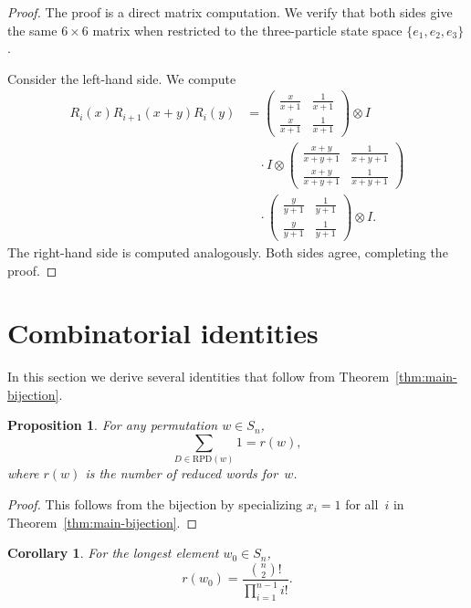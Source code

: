 \documentclass{amsart}
\theoremstyle{plain}
\newtheorem{proposition}[theorem]{Proposition}
\newtheorem{corollary}[theorem]{Corollary}
\theoremstyle{definition}
\theoremstyle{remark}
\begin{document}
\begin{proof}
The proof is a direct matrix computation. We verify that both sides
give the same $6 \times 6$ matrix when restricted to the three-particle
state space $\{e_1, e_2, e_3\}$.

Consider the left-hand side.  We compute
\begin{align*}
R_i(x) R_{i+1}(x+y) R_i(y)
  &= \begin{pmatrix} \frac{x}{x+1} & \frac{1}{x+1} \\ \frac{x}{x+1} & \frac{1}{x+1} \end{pmatrix}
     \otimes I \\
  &\quad \cdot I \otimes \begin{pmatrix} \frac{x+y}{x+y+1} & \frac{1}{x+y+1} \\ \frac{x+y}{x+y+1} & \frac{1}{x+y+1} \end{pmatrix}
     \\
  &\quad \cdot \begin{pmatrix} \frac{y}{y+1} & \frac{1}{y+1} \\ \frac{y}{y+1} & \frac{1}{y+1} \end{pmatrix}
     \otimes I.
\end{align*}
The right-hand side is computed analogously.  Both sides agree, completing
the proof.
\end{proof}

\section{Combinatorial identities}
\label{sec:identities}

In this section we derive several identities that follow from
Theorem~\ref{thm:main-bijection}.

\begin{proposition}
\label{prop:sum-identity}
For any permutation $w \in S_n$,
\[
\sum_{D \in \mathrm{RPD}(w)} 1 = r(w),
\]
where $r(w)$ is the number of reduced words for~$w$.
\end{proposition}

\begin{proof}
This follows from the bijection by specializing $x_i = 1$ for all~$i$
in Theorem~\ref{thm:main-bijection}.
\end{proof}

\begin{corollary}
\label{cor:longest-element}
For the longest element $w_0 \in S_n$,
\[
r(w_0) = \frac{\binom{n}{2}!}{\prod_{i=1}^{n-1} i!}.
\]
\end{corollary}
\end{document}
